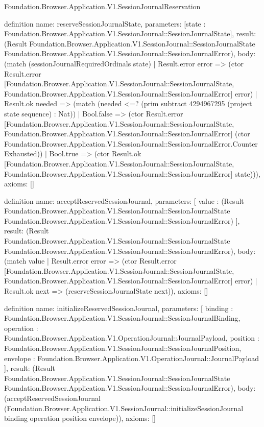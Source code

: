 \begin{lexlean}{Foundation.Browser.Application.V1.SessionJournalReservation}
\begin{semanticmodule}
definition{
  name: reserveSessionJournalState,
  parameters: [state : Foundation.Browser.Application.V1.SessionJournal::SessionJournalState],
  result: (Result Foundation.Browser.Application.V1.SessionJournal::SessionJournalState Foundation.Browser.Application.V1.SessionJournal::SessionJournalError),
  body: (match (sessionJournalRequiredOrdinals state)
    | Result.error error => (ctor Result.error [Foundation.Browser.Application.V1.SessionJournal::SessionJournalState, Foundation.Browser.Application.V1.SessionJournal::SessionJournalError] error)
    | Result.ok needed => (match (needed <=? (prim subtract 4294967295 (project state sequence) : Nat))
      | Bool.false => (ctor Result.error [Foundation.Browser.Application.V1.SessionJournal::SessionJournalState, Foundation.Browser.Application.V1.SessionJournal::SessionJournalError] (ctor Foundation.Browser.Application.V1.SessionJournal::SessionJournalError.CounterExhausted))
      | Bool.true => (ctor Result.ok [Foundation.Browser.Application.V1.SessionJournal::SessionJournalState, Foundation.Browser.Application.V1.SessionJournal::SessionJournalError] state))),
  axioms: []
}

definition{
  name: acceptReservedSessionJournal,
  parameters: [
    value : (Result Foundation.Browser.Application.V1.SessionJournal::SessionJournalState Foundation.Browser.Application.V1.SessionJournal::SessionJournalError)
  ],
  result: (Result Foundation.Browser.Application.V1.SessionJournal::SessionJournalState Foundation.Browser.Application.V1.SessionJournal::SessionJournalError),
  body: (match value
    | Result.error error => (ctor Result.error [Foundation.Browser.Application.V1.SessionJournal::SessionJournalState, Foundation.Browser.Application.V1.SessionJournal::SessionJournalError] error)
    | Result.ok next => (reserveSessionJournalState next)),
  axioms: []
}

definition{
  name: initializeReservedSessionJournal,
  parameters: [
    binding : Foundation.Browser.Application.V1.SessionJournal::SessionJournalBinding,
    operation : Foundation.Browser.Application.V1.OperationJournal::JournalPayload,
    position : Foundation.Browser.Application.V1.SessionJournal::SessionJournalPosition,
    envelope : Foundation.Browser.Application.V1.OperationJournal::JournalPayload
  ],
  result: (Result Foundation.Browser.Application.V1.SessionJournal::SessionJournalState Foundation.Browser.Application.V1.SessionJournal::SessionJournalError),
  body: (acceptReservedSessionJournal (Foundation.Browser.Application.V1.SessionJournal::initializeSessionJournal binding operation position envelope)),
  axioms: []
}


\end{semanticmodule}
\end{lexlean}
